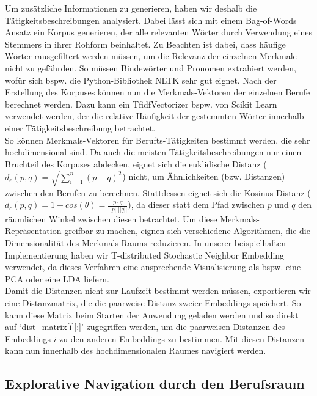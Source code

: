 \documentclass[10pt]{article}
\begin{document}
Um zusätzliche Informationen zu generieren, haben wir deshalb die
Tätigkeitsbeschreibungen analysiert. Dabei lässt sich mit einem Bag-of-Words
Ansatz ein Korpus generieren, der alle relevanten Wörter durch Verwendung eines
Stemmers in ihrer Rohform beinhaltet. Zu Beachten ist dabei, dass häufige Wörter
rausgefiltert werden müssen, um die Relevanz der einzelnen Merkmale nicht zu
gefährden. So müssen Bindewörter und Pronomen extrahiert werden, wofür sich
bspw. die Python-Bibliothek NLTK sehr gut eignet. Nach der Erstellung des
Korpuses können nun die Merkmals-Vektoren der einzelnen Berufe berechnet werden.
Dazu kann ein TfidfVectorizer bspw. von Scikit Learn verwendet werden, der die
relative Häufigkeit der gestemmten Wörter innerhalb einer Tätigkeitsbeschreibung
betrachtet.\\

So können Merkmals-Vektoren für Berufts-Tätigkeiten bestimmt werden, die sehr
hochdimensional sind. Da auch die meisten Tätigkeitsbeschreibungen nur einen
Bruchteil des Korpuses abdecken, eignet sich die euklidische Distanz ($d_e(p,q)
= \sqrt{\sum_{i=1}^n (p-q)^2}$) nicht, um Ähnlichkeiten (bzw. Distanzen)
zwischen den Berufen zu berechnen. Stattdessen eignet sich die Kosinus-Distanz
($d_c(p,q) = 1 - cos(\theta) = \frac{p \cdot q}{||p|| ||q||}$), da dieser statt
dem Pfad zwischen $p$ und $q$ den räumlichen Winkel zwischen diesen betrachtet.
Um diese Merkmals-Repräsentation greifbar zu machen, eignen sich verschiedene
Algorithmen, die die Dimensionalität des Merkmals-Raums reduzieren. In unserer
beispielhaften Implementierung haben wir T-distributed Stochastic Neighbor
Embedding verwendet, da dieses Verfahren eine ansprechende Visualisierung als
bspw. eine PCA oder eine LDA liefern.\\

Damit die Distanzen nicht zur Laufzeit bestimmt werden müssen, exportieren wir
eine Distanzmatrix, die die paarweise Distanz zweier Embeddings speichert. So
kann diese Matrix beim Starten der Anwendung geladen werden und so direkt auf
`dist\_matrix[i][:]' zugegriffen werden, um die paarweisen Distanzen des
Embeddings $i$ zu den anderen Embeddings zu bestimmen. Mit diesen Distanzen kann
nun innerhalb des hochdimensionalen Raumes navigiert werden.

\subsection{Explorative Navigation durch den Berufsraum}
\end{document}
